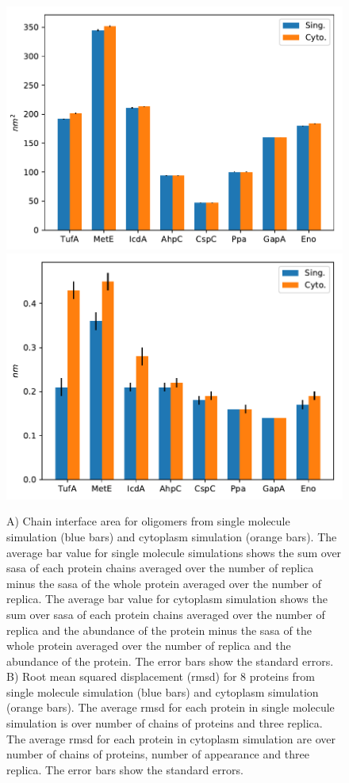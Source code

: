 \documentclass[journal=jacsat,manuscript=article]{achemso}
\begin{document}
\begin{figure}[H]
\includegraphics[scale=0.5]{sasa.pdf}
\includegraphics[scale=0.5]{rmsd.pdf}

\caption{A) Chain interface area for oligomers from single molecule simulation (blue bars) and cytoplasm simulation (orange bars). The average bar value for single molecule simulations shows the sum over sasa of each protein chains averaged over the number of replica minus the sasa of the whole protein averaged over the number of replica. The average bar value for cytoplasm simulation shows the sum over sasa of each protein chains averaged over the number of replica and the abundance of the protein minus the sasa of the whole protein averaged over the number of replica and the abundance of the protein. The error bars show the standard errors. B) Root mean squared displacement (rmsd) for 8 proteins from single molecule simulation (blue bars) and cytoplasm simulation (orange bars). The average rmsd for each protein in single molecule simulation is over number of chains of proteins and three replica. The average rmsd for each protein in cytoplasm simulation are over number of chains of proteins, number of appearance and three replica. The error bars show the standard errors.}
\label{fig:structural_integrity_chain}
\end{figure}
\end{document}
